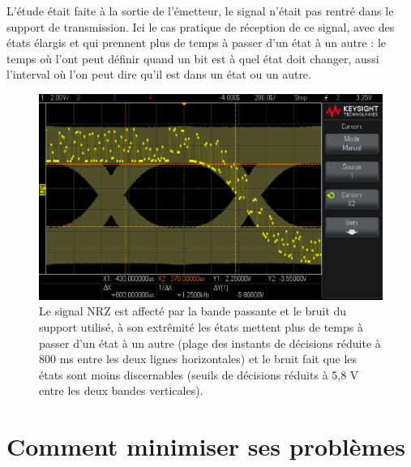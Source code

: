 \noindent L'étude était faite à la sortie de l'émetteur, le signal n'était pas rentré dans le support de transmission. Ici le cas pratique de réception de ce signal, avec des états élargis et qui prennent plus de temps à passer d'un état à un autre : le temps où l'ont peut définir quand un bit est à quel état doit changer, aussi l'interval où l'on peut dire qu'il est dans un état ou un autre.

\begin{figure}[H]
      \centering
      \includegraphics[width=\textwidth - \textwidth / 4]{ressources/r305/04.png}
      \caption{Le signal NRZ est affecté par la bande passante et le bruit du support utilisé, à son extrêmité les états mettent plus de temps à passer d'un état à un autre (plage des instants de décisions réduite à 800 ms entre les deux lignes horizontales) et le bruit fait que les états sont moins discernables (seuils de décisions réduits à 5,8 V entre les deux bandes verticales).}
      \label{fig:r3053}
\end{figure}

\section{Comment minimiser ses problèmes}

